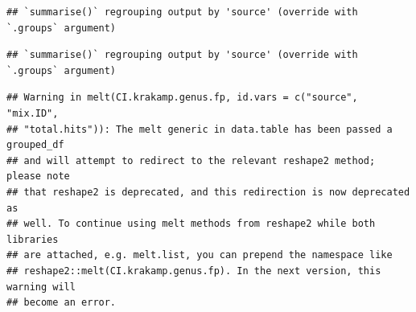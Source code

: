 \documentclass[
]{article}
\newenvironment{Shaded}{\begin{snugshade}}{\end{snugshade}}
\newcommand{\CommentTok}[1]{\textcolor[rgb]{0.56,0.35,0.01}{\textit{#1}}}
\newcommand{\DataTypeTok}[1]{\textcolor[rgb]{0.13,0.29,0.53}{#1}}
\newcommand{\KeywordTok}[1]{\textcolor[rgb]{0.13,0.29,0.53}{\textbf{#1}}}
\newcommand{\NormalTok}[1]{#1}
\newcommand{\OperatorTok}[1]{\textcolor[rgb]{0.81,0.36,0.00}{\textbf{#1}}}
\newcommand{\StringTok}[1]{\textcolor[rgb]{0.31,0.60,0.02}{#1}}
\begin{document}
\begin{verbatim}
## `summarise()` regrouping output by 'source' (override with `.groups` argument)
\end{verbatim}

\begin{Shaded}
\end{Shaded}

\begin{verbatim}
## `summarise()` regrouping output by 'source' (override with `.groups` argument)
\end{verbatim}

\begin{Shaded}
\end{Shaded}

\begin{verbatim}
## Warning in melt(CI.krakamp.genus.fp, id.vars = c("source", "mix.ID",
## "total.hits")): The melt generic in data.table has been passed a grouped_df
## and will attempt to redirect to the relevant reshape2 method; please note
## that reshape2 is deprecated, and this redirection is now deprecated as
## well. To continue using melt methods from reshape2 while both libraries
## are attached, e.g. melt.list, you can prepend the namespace like
## reshape2::melt(CI.krakamp.genus.fp). In the next version, this warning will
## become an error.
\end{verbatim}
\end{document}
